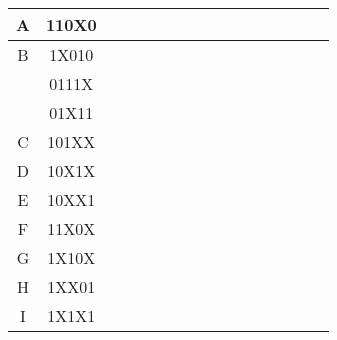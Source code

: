 \documentclass{article}
\begin{document}
\begin{flushleft}
\begin{tabular}{|c|c|r*{13}{|c}|}
    A & 110X0&\makecell{ }&\makecell{ }&\makecell{ }&\makecell{ }&\makecell{ }&\makecell{ }&\makecell{ }&\makecell{ }&&\makecell{ }&&\makecell{ }&\makecell{ }\\ \hline
    B & 1X010&\makecell{ }&\makecell{ }&\makecell{ }&&\makecell{ }&\makecell{ }&\makecell{ }&\makecell{ }&\makecell{ }&\makecell{ }&&\makecell{ }&\makecell{ }\\ \hline
    & 0111X&\makecell{ }&&\makecell{ }&\makecell{ }&\makecell{ }&\makecell{ }&\makecell{ }&\makecell{ }&\makecell{ }&\makecell{ }&\makecell{ }&\makecell{ }&\makecell{ }\\ [-1.6ex] \hline\noalign{\vspace{\dimexpr 1.6ex-\doublerulesep}} \hline
    & 01X11&&\makecell{ }&\makecell{ }&\makecell{ }&\makecell{ }&\makecell{ }&\makecell{ }&\makecell{ }&\makecell{ }&\makecell{ }&\makecell{ }&\makecell{ }&\makecell{ }\\ [-1.6ex] \hline\noalign{\vspace{\dimexpr 1.6ex-\doublerulesep}} \hline
    C & 101XX&\makecell{ }&\makecell{ }&\makecell{ }&\makecell{ }&\makecell{ }&&&&\makecell{ }&\makecell{ }&\makecell{ }&\makecell{ }&\makecell{ }\\ \hline
    D & 10X1X&\makecell{ }&\makecell{ }&\makecell{ }&&&\makecell{ }&\makecell{ }&&\makecell{ }&\makecell{ }&\makecell{ }&\makecell{ }&\makecell{ }\\ \hline
    E & 10XX1&\makecell{ }&\makecell{ }&&\makecell{ }&&\makecell{ }&&\makecell{ }&\makecell{ }&\makecell{ }&\makecell{ }&\makecell{ }&\makecell{ }\\ \hline
    F & 11X0X&\makecell{ }&\makecell{ }&\makecell{ }&\makecell{ }&\makecell{ }&\makecell{ }&\makecell{ }&\makecell{ }&&&\makecell{ }&&\\ \hline
    G & 1X10X&\makecell{ }&\makecell{ }&\makecell{ }&\makecell{ }&\makecell{ }&&&\makecell{ }&\makecell{ }&\makecell{ }&\makecell{ }&&\\ \hline
    H & 1XX01&\makecell{ }&\makecell{ }&&\makecell{ }&\makecell{ }&\makecell{ }&&\makecell{ }&\makecell{ }&&\makecell{ }&\makecell{ }&\\ \hline
    I & 1X1X1&\makecell{ }&\makecell{ }&\makecell{ }&\makecell{ }&\makecell{ }&\makecell{ }&&\makecell{ }&\makecell{ }&\makecell{ }&\makecell{ }&\makecell{ }&\\ \hline

\end{tabular}
\end{flushleft}
\end{document}
